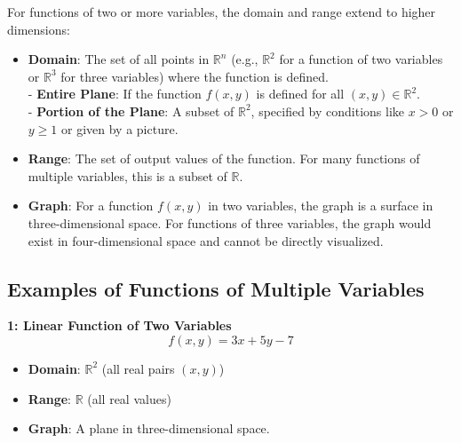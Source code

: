 \documentclass[a4paper,12pt,openany]{book}
\begin{document}
For functions of two or more variables, the domain and range extend to higher dimensions:
\begin{itemize}
    \item \textbf{Domain}: The set of all points in \(\mathbb{R}^n\) (e.g., \(\mathbb{R}^2\) for a function of two variables or \(\mathbb{R}^3\) for three variables) where the function is defined.\\
        - \textbf{Entire Plane}: If the function \( f(x, y) \) is defined for all \((x, y) \in \mathbb{R}^2\).\\
        - \textbf{Portion of the Plane}: A subset of \(\mathbb{R}^2\), specified by conditions like \(x > 0\) or \(y \geq 1\) or given by a picture.
    \item \textbf{Range}: The set of output values of the function. For many functions of multiple variables, this is a subset of \(\mathbb{R}\).
    \item \textbf{Graph}: For a function \( f(x, y) \) in two variables, the graph is a surface in three-dimensional space. For functions of three variables, the graph would exist in four-dimensional space and cannot be directly visualized.
\end{itemize}

\subsection*{Examples of Functions of Multiple Variables}

\textbf{1: Linear Function of Two Variables}
    \[
    f(x, y) = 3x + 5y - 7
    \]
    \begin{itemize}
        \item \textbf{Domain}: \(\mathbb{R}^2\) (all real pairs \((x, y)\))
        \item \textbf{Range}: \(\mathbb{R}\) (all real values)
        \item \textbf{Graph}: A plane in three-dimensional space.
    \end{itemize}
\end{document}
